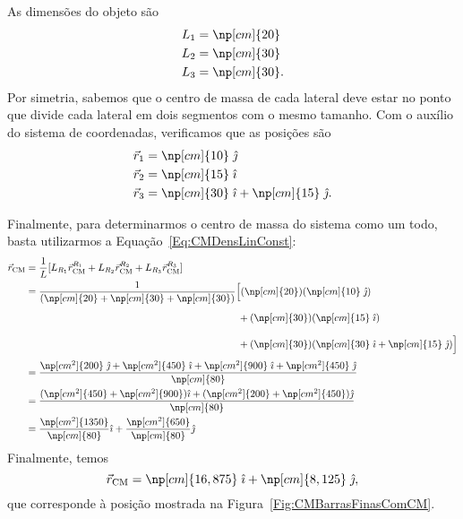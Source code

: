As dimensões do objeto são
\begin{align}
    L_1 &= \np[cm]{20} \\
    L_2 &= \np[cm]{30} \\
    L_3 &= \np[cm]{30}.
\end{align}
%
Por simetria, sabemos que o centro de massa de cada lateral deve estar no ponto que divide cada lateral em dois segmentos com o mesmo tamanho. Com o auxílio do sistema de coordenadas, verificamos que as posições são
\begin{align}
    \vec{r}_1 &= \np[cm]{10} \;\versj \\
    \vec{r}_2 &= \np[cm]{15} \;\versi \\
    \vec{r}_3 &= \np[cm]{30} \;\versi + \np[cm]{15} \;\versj.
\end{align}

Finalmente, para determinarmos o centro de massa do sistema como um todo, basta utilizarmos a Equação~\ref{Eq:CMDensLinConst}:
\begin{align*}
    \vec{r}_{\rm{CM}} &= \frac{1}{L} [L_{R_1} \vec{r}_{\rm{CM}}^{R_1} + L_{R_2} \vec{r}_{\rm{CM}}^{R_2} + L_{R_3} \vec{r}_{\rm{CM}}^{R_3} ] \\
    &= \frac{1}{(\np[cm]{20} + \np[cm]{30} + \np[cm]{30})} \Big[(\np[cm]{20}) (\np[cm]{10} \;\versj) \\ \nonumber
    &\phantom{= \frac{1}{(\np[cm]{20} + \np[cm]{30} + \np[cm]{30})} \Big[}+ (\np[cm]{30}) (\np[cm]{15} \;\versi) \\ \nonumber
    &\phantom{= \frac{1}{(\np[cm]{20} + \np[cm]{30} + \np[cm]{30})} \Big[}+ (\np[cm]{30}) (\np[cm]{30} \;\versi + \np[cm]{15} \;\versj)\Big]\\
    &= \frac{\np[cm^2]{200}\;\versj + \np[cm^2]{450}\;\versi + \np[cm^2]{900}\;\versi + \np[cm^2]{450}\;\versj}{\np[cm]{80}} \\
    &= \frac{(\np[cm^2]{450} + \np[cm^2]{900})\versi + (\np[cm^2]{200} + \np[cm^2]{450})\versj}{\np[cm]{80}} \\
    &= \frac{\np[cm^2]{1350}}{\np[cm]{80}}\versi + \frac{\np[cm^2]{650}}{\np[cm]{80}}\versj
\end{align*}
%
Finalmente, temos
\begin{equation}
    \vec{r}_{\rm{CM}} = \np[cm]{16,875}\;\versi + \np[cm]{8,125}\;\versj,
\end{equation}
%
que corresponde à posição mostrada na Figura~\eqref{Fig:CMBarrasFinasComCM}.

